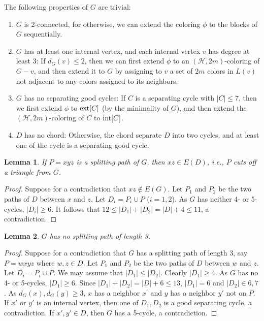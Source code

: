 \documentclass{article}
\newtheorem{lemma}{Lemma}
\begin{document}
The following properties of $G$ are trivial:
\begin{enumerate}
    \item $G$ is 2-connected, for otherwise, we can extend the coloring $\phi$ to the blocks of $G$ sequentially.
    \item $G$ has at least one internal vertex, and each internal vertex $v$ has degree at least 3: If $d_G(v) \le 2$, then we can first extend $\phi$ to an $(\mathcal{H},2m)$-coloring of $G-v$, and then extend it to $G$ by assigning to $v$ a set of $2m$ colors in $L(v)$ not adjacent to any colors assigned to its neighbors. 
    \item $G$ has no separating good cycles: If $C$ is a separating cycle with $|C| \le 7$, then we first extend $\phi$ to ${\rm ext}[C]$ (by the minimality of $G$), and then extend the $(\mathcal{H},2m)$-coloring of $C$ to ${\rm int}[C]$. 
    \item $D$ has no chord: Otherwise, the chord separate $D$ into two cycles, and at least one of the cycle is a separating good cycle.
\end{enumerate}
 



\begin{lemma}
\label{lem:8}
    If $P=xyz$ is a splitting path of $G$, then $xz\in E(D)$, i.e.,  $P$ cuts off a triangle from $G$.
\end{lemma}
\begin{proof}
    Suppose for a contradiction that $xz\notin E(G)$. Let $P_1$ and $P_2$ be the two paths of $D$ between $x$ and $z$. Let $D_i=P_i\cup P$  ($i=1,2$). As $G$ has neither 4- or 5-cycles, $|D_i|\ge6$. It follows that $12\le |D_1|+|D_2|=|D|+4\le 11$, a contradiction.
\end{proof}

\begin{lemma}
\label{lem:9}
    $G$ has no splitting path of length 3.
\end{lemma}
\begin{proof}
    Suppose for a contradiction that $G$ has a splitting path of length 3, say $P=wxyz$ where $w,z\in D$. Let $P_1$ and $P_2$ be the two paths of $D$ between $w$ and $z$. Let $D_i=P_i\cup P$. We may assume that $|D_1| \le|D_2|$. Clearly $|D_1| \ge 4$. As $G$ has no 4- or 5-cycles, $|D_1|\ge 6$. Since $|D_1|+|D_2|=|D|+6 \le 13$, $|D_1|=6$ and $|D_2|\in {6,7}$. As $d_G(x), d_G(y) \ge 3$, $x$ has a neighbor $x^{\prime}$ and $y$ has a neighbor $y'$ not on $P$. If $x'$ or $y'$ is an internal vertex, then one of $D_1,D_2$ is a good separating cycle, a contradiction. If $x', y' \in D$, then $G$ has a 5-cycle, a contradiction. 
\end{proof}
\end{document}
